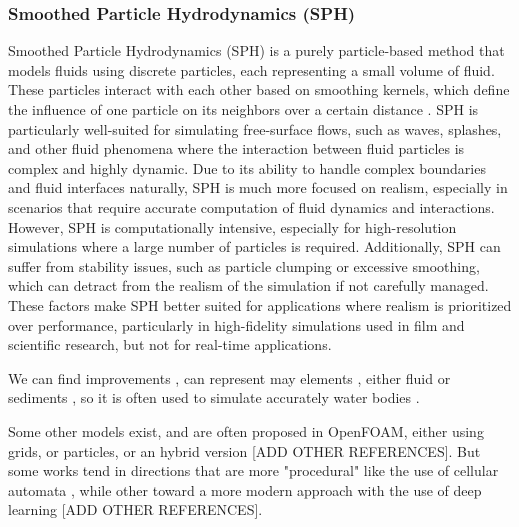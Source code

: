 \subsubsection{Smoothed Particle Hydrodynamics (SPH)}

Smoothed Particle Hydrodynamics (SPH) \cite{Muller2003} is a purely particle-based method that models fluids using discrete particles, each representing a small volume of fluid. These particles interact with each other based on smoothing kernels, which define the influence of one particle on its neighbors over a certain distance \cite{Koschier2022}. SPH is particularly well-suited for simulating free-surface flows, such as waves, splashes, and other fluid phenomena where the interaction between fluid particles is complex and highly dynamic. Due to its ability to handle complex boundaries and fluid interfaces naturally, SPH is much more focused on realism, especially in scenarios that require accurate computation of fluid dynamics and interactions. However, SPH is computationally intensive, especially for high-resolution simulations where a large number of particles is required. Additionally, SPH can suffer from stability issues, such as particle clumping or excessive smoothing, which can detract from the realism of the simulation if not carefully managed. These factors make SPH better suited for applications where realism is prioritized over performance, particularly in high-fidelity simulations used in film and scientific research, but not for real-time applications.

We can find improvements \cite{Roose2011}, can represent may elements \cite{Iwasaki2010}, either fluid or sediments \cite{Lenaerts2009}, so it is often used to simulate accurately water bodies \cite{Nikeghabali2018}.

Some other models exist, and are often proposed in OpenFOAM, either using grids, or particles, or an hybrid version \cite{Caretto1973} [ADD OTHER REFERENCES]. But some works tend in directions that are more "procedural" like the use of cellular automata \cite{Boldea2009,Cattaneo2005}, while other toward a more modern approach with the use of deep learning \cite{Tompson2017} [ADD OTHER REFERENCES].







